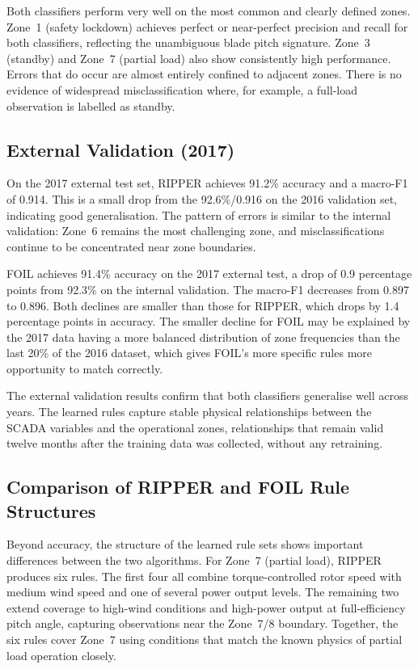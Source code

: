 Both classifiers perform very well on the most common and clearly defined zones. Zone~1
(safety lockdown) achieves perfect or near-perfect precision and recall for both
classifiers, reflecting the unambiguous blade pitch signature. Zone~3 (standby) and
Zone~7 (partial load) also show consistently high performance. Errors that do occur are
almost entirely confined to adjacent zones. There is no evidence of widespread
misclassification where, for example, a full-load observation is labelled as standby.

\subsection{External Validation (2017)}
\label{subsec:ch3:results:ext}

On the 2017 external test set, RIPPER achieves 91.2\% accuracy and a macro-F1 of 0.914.
This is a small drop from the 92.6\%/0.916 on the 2016 validation set, indicating good
generalisation. The pattern of errors is similar to the internal validation: Zone~6
remains the most challenging zone, and misclassifications continue to be concentrated
near zone boundaries.

FOIL achieves 91.4\% accuracy on the 2017 external test, a drop of 0.9 percentage
points from 92.3\% on the internal validation. The macro-F1 decreases from 0.897 to
0.896. Both declines are smaller than those for RIPPER, which drops by 1.4 percentage
points in accuracy. The smaller decline for FOIL may be explained by the 2017 data
having a more balanced distribution of zone frequencies than the last 20\% of the 2016
dataset, which gives FOIL's more specific rules more opportunity to match correctly.

The external validation results confirm that both classifiers generalise well across
years. The learned rules capture stable physical relationships between the SCADA variables
and the operational zones, relationships that remain valid twelve months after the
training data was collected, without any retraining.

\subsection{Comparison of RIPPER and FOIL Rule Structures}
\label{subsec:ch3:results:rules}

Beyond accuracy, the structure of the learned rule sets shows important differences
between the two algorithms. For Zone~7 (partial load), RIPPER produces six rules. The
first four all combine torque-controlled rotor speed with medium wind speed and one of
several power output levels. The remaining two extend coverage to high-wind conditions
and high-power output at full-efficiency pitch angle, capturing observations near the
Zone~7/8 boundary. Together, the six rules cover Zone~7 using conditions that match the
known physics of partial load operation closely.

